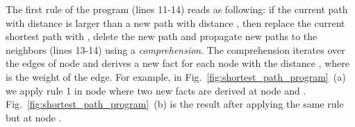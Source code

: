 \begin{dblfig}
\vspace*{-2ex}
\begin{center}
  \hspace{0.4cm}
  \hspace{0.4cm}
\end{center}
\vspace*{-1ex}
\end{dblfig}


The first rule of the program (lines 11-14) reads as following: if the current
 path  with distance  is larger
than a new path  with distance , then replace the
current shortest path with , delete the new  path and
propagate new paths to the neighbors (lines 13-14) using a \emph{comprehension}.
The comprehension iterates over the edges of node  and derives a new
 fact for each node  with the distance ,
where  is the weight of the edge. For
example, in Fig.~\ref{fig:shortest_path_program}~(a) we apply rule 1 in node
 where two new  facts are derived at node 
and . Fig.~\ref{fig:shortest_path_program}~(b) is the result after
applying the same rule but at node .

